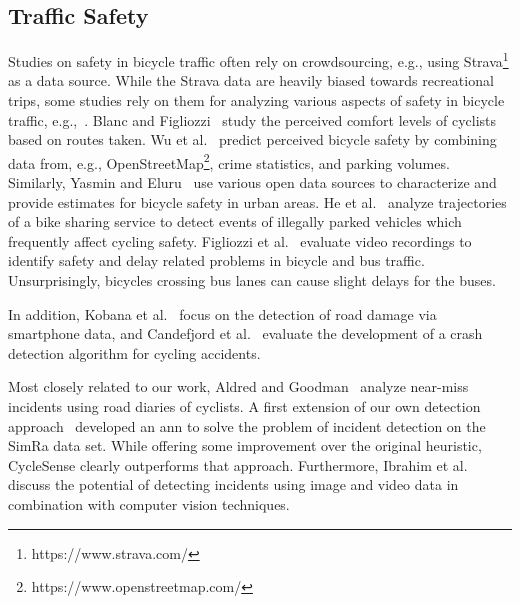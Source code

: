 \subsection{Traffic Safety\label{subsec:trafficsafety}}
Studies on safety in bicycle traffic often rely on crowdsourcing, e.g., using Strava\footnote{https://www.strava.com/} as a data source.
While the Strava data are heavily biased towards recreational trips, some studies rely on them for analyzing various aspects of safety in bicycle traffic, e.g.,~\cite{hochmair2019estimating,ferster2021strava}.
Blanc and Figliozzi~\cite{blanc2016modeling, blanc2017safety} study the perceived comfort levels of cyclists based on routes taken.
Wu et al.~\cite{wu2018predicting} predict perceived bicycle safety by combining data from, e.g., OpenStreetMap\footnote{https://www.openstreetmap.com/}, crime statistics, and parking volumes.
Similarly, Yasmin and Eluru~\cite{yasmin2016latent} use various open data sources to characterize and provide estimates for bicycle safety in urban areas.
He et al.~\cite{he2018detecting} analyze trajectories of a bike sharing service to detect events of illegally parked vehicles which frequently affect cycling safety.
Figliozzi et al.~\cite{figliozzi2019evaluation} evaluate video recordings to identify safety and delay related problems in bicycle and bus traffic.
Unsurprisingly, bicycles crossing bus lanes can cause slight delays for the buses.

In addition, Kobana et al.~\cite{kobana2014detection} focus on the detection of road damage via smartphone data, and Candefjord et al.~\cite{candefjord2014using} evaluate the development of a crash detection algorithm for cycling accidents.

Most closely related to our work, Aldred and Goodman~\cite{aldred2018predictors} analyze near-miss incidents using road diaries of cyclists.
A first extension of our own detection approach~\cite{sanchez2020detecting} developed an \ac{ann} to solve the problem of incident detection on the SimRa data set.
While offering some improvement over the original heuristic, CycleSense clearly outperforms that approach.
Furthermore, Ibrahim et al.~\cite{ibrahim2021cycling} discuss the potential of detecting incidents using image and video data in combination with computer vision techniques.

